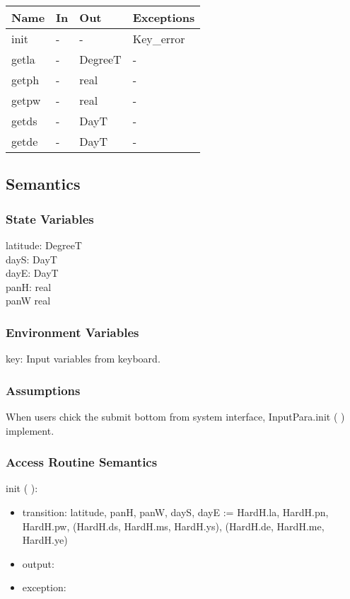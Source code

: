 \documentclass[12pt, titlepage]{article}
\begin{document}
\begin{center}
\begin{tabular}{p{2cm} p{4cm} p{4cm} p{2cm}}
\hline
\textbf{Name} & \textbf{In} & \textbf{Out} & \textbf{Exceptions} \\
\hline 
init & - & - & Key\_error \\
getla & - & DegreeT & - \\
getph & - & real & - \\
getpw & - & real & - \\
getds & - & DayT & - \\
getde & - & DayT & - \\


\hline
\end{tabular}
\end{center}


\subsection{Semantics}

\subsubsection{State Variables}
latitude: DegreeT\\
dayS: DayT\\
dayE: DayT\\
panH: real\\
panW real


\subsubsection{Environment Variables}
key: Input variables from keyboard.

\subsubsection{Assumptions}
When users chick the submit bottom from system interface, InputPara.init ( ) implement.

\subsubsection{ Access Routine Semantics}

\noindent  init ( ):
\begin{itemize}
\item transition: latitude, panH, panW, dayS, dayE := HardH.la, HardH.pn, HardH.pw, (HardH.ds, HardH.ms, HardH.ys), (HardH.de, HardH.me, HardH.ye)
\item output:
\item exception: 
\end{itemize}
\end{document}
